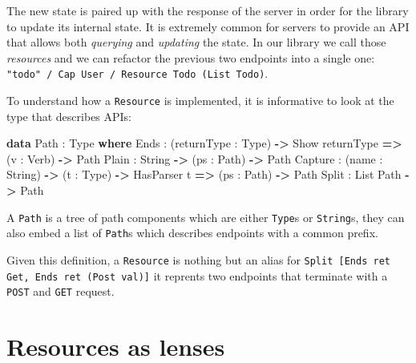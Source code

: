 \documentclass[sigplan,screen,review, nonacm]{acmart}
\newenvironment{Shaded}{}{}
\newcommand{\DataTypeTok}[1]{\textcolor[rgb]{0.56,0.13,0.00}{#1}}
\newcommand{\FunctionTok}[1]{\textcolor[rgb]{0.02,0.16,0.49}{#1}}
\newcommand{\KeywordTok}[1]{\textcolor[rgb]{0.00,0.44,0.13}{\textbf{#1}}}
\newcommand{\OperatorTok}[1]{\textcolor[rgb]{0.40,0.40,0.40}{#1}}
\newcommand{\OtherTok}[1]{\textcolor[rgb]{0.00,0.44,0.13}{#1}}
\newcommand{\StringTok}[1]{\textcolor[rgb]{0.25,0.44,0.63}{#1}}
\begin{document}
The new state is paired up with the response of the server in order for
the library to update its internal state. It is
extremely common for servers to provide an API that allows both
\emph{querying} and \emph{updating} the state. In our library we call
those \emph{resources} and we can refactor the previous two endpoints into a
single one:
\texttt{\StringTok{"todo"}\ \OperatorTok{/}\ \OtherTok{Cap}\ \DataTypeTok{User}\ \OperatorTok{/}\ \OtherTok{Resource}\ \DataTypeTok{Todo}\ (\OtherTok{List}\ \DataTypeTok{Todo})}.

To understand how a \texttt{Resource} is implemented, it is informative to
look at the type that describes APIs:

\begin{Shaded}
\begin{Highlighting}[]
\KeywordTok{data} \DataTypeTok{Path} : \DataTypeTok{Type} \KeywordTok{where}
  \FunctionTok{Ends} : (returnType : \DataTypeTok{Type}) \KeywordTok{->}
         \OtherTok{Show} returnType \KeywordTok{=>}
         (v : \DataTypeTok{Verb}) \KeywordTok{->} \DataTypeTok{Path}
  \FunctionTok{Plain} : \DataTypeTok{String} \KeywordTok{->} (ps : \DataTypeTok{Path}) \KeywordTok{->} \DataTypeTok{Path}
  \FunctionTok{Capture} : (name : \DataTypeTok{String}) \KeywordTok{->}
            (t : \DataTypeTok{Type}) \KeywordTok{->} \OtherTok{HasParser} t \KeywordTok{=>}
            (ps : \DataTypeTok{Path}) \KeywordTok{->} \DataTypeTok{Path}
  \FunctionTok{Split} : \OtherTok{List} \DataTypeTok{Path} \KeywordTok{->} \DataTypeTok{Path}
\end{Highlighting}
\end{Shaded}

A \texttt{\DataTypeTok{Path}} is a tree of path components which are either
\texttt{\DataTypeTok{Type}}s or \texttt{\DataTypeTok{String}}s,
they can also embed a list of \texttt{\DataTypeTok{Path}}s which describes endpoints with a
common prefix.

Given this definition, a \texttt{\OtherTok{Resource}} is nothing but an alias for
\texttt{\FunctionTok{Split} [\FunctionTok{Ends} ret \DataTypeTok{Get}, \FunctionTok{Ends} ret (\OtherTok{Post} val)]}
it reprents two endpoints that terminate with a \texttt{POST} and
\texttt{GET} request.


\hypertarget{resources-as-lenses}{%
\section{Resources as lenses}\label{resources-as-lenses}}
\end{document}
